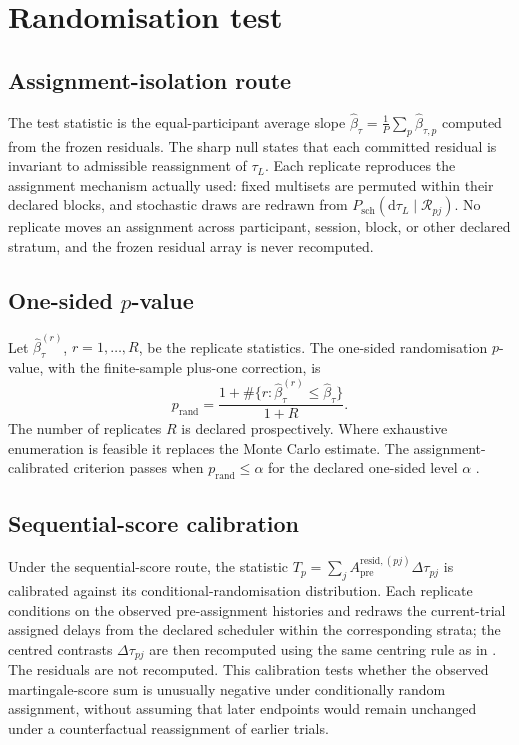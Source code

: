 \documentclass[11pt,a4paper]{article}
\theoremstyle{definition}
\newcommand{\Apre}{A_{\mathrm{pre}}}
\newcommand{\tauL}{\tau_L}
\begin{document}
\section{Randomisation test}
\label{sec:si-randomisation-test}

\subsection{Assignment-isolation route}
\label{sec:si-iso-route}

The test statistic is the equal-participant average slope
\(\widehat{\beta}_\tau=\frac1P\sum_p\widehat{\beta}_{\tau,p}\) computed from the
frozen residuals. The sharp null states that each committed residual is invariant
to admissible reassignment of \(\tauL\). Each replicate reproduces the assignment
mechanism actually used: fixed multisets are permuted within their declared
blocks, and stochastic draws are redrawn from
\(P_{\mathrm{sch}}(\mathrm{d}\tauL\mid\mathcal{R}_{pj})\). No replicate moves an
assignment across participant, session, block, or other declared stratum, and the
frozen residual array is never recomputed.

\subsection{One-sided \texorpdfstring{$p$}{p}-value}
\label{sec:si-pvalue}

Let \(\widehat{\beta}_\tau^{(r)}\), \(r=1,\dots,R\), be the replicate statistics.
The one-sided randomisation \(p\)-value, with the finite-sample plus-one
correction, is
\begin{equation}
\label{eq:si-pvalue}
p_{\mathrm{rand}}
=\frac{1+\#\{r:\widehat{\beta}_\tau^{(r)}\le\widehat{\beta}_\tau\}}{1+R}.
\end{equation}
The number of replicates \(R\) is declared prospectively. Where exhaustive
enumeration is feasible it replaces the Monte Carlo estimate. The
assignment-calibrated criterion passes when \(p_{\mathrm{rand}}\le\alpha\) for the
declared one-sided level \(\alpha\) \citep{Harris2023}.

\subsection{Sequential-score calibration}
\label{sec:si-seq-calibration}

Under the sequential-score route, the statistic
\(T_p=\sum_{j}\Apre^{\mathrm{resid},(pj)}\Delta\tau_{pj}\) is calibrated against
its conditional-randomisation distribution. Each replicate conditions on the
observed pre-assignment histories and redraws the current-trial assigned delays
from the declared scheduler within the corresponding strata; the centred
contrasts \(\Delta\tau_{pj}\) are then recomputed using the same centring rule as
in . The residuals are not recomputed. This
calibration tests whether the observed martingale-score sum is unusually
negative under conditionally random assignment, without assuming that later
endpoints would remain unchanged under a counterfactual reassignment of earlier
trials.
\end{document}
